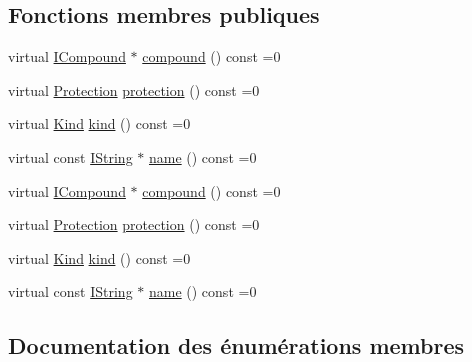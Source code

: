 \subsection*{Fonctions membres publiques}
\begin{DoxyCompactItemize}
\item 
virtual \hyperlink{class_i_compound}{I\+Compound} $\ast$ \hyperlink{class_i_related_compound_abd3870e8179f31e6bfc061ab1af7c6bd}{compound} () const  =0
\item 
virtual \hyperlink{class_i_related_compound_ac12e6e12784095cde8962012102e9709}{Protection} \hyperlink{class_i_related_compound_af3e8f1ef9664342f6200349e47ff5d18}{protection} () const  =0
\item 
virtual \hyperlink{class_i_related_compound_a70abfb2e64571aa06b83bd7da0888363}{Kind} \hyperlink{class_i_related_compound_a24dee0bec50846158feaed7639aae060}{kind} () const  =0
\item 
virtual const \hyperlink{class_i_string}{I\+String} $\ast$ \hyperlink{class_i_related_compound_af99bd2e0ec6834f84d41401c2532c52f}{name} () const  =0
\item 
virtual \hyperlink{class_i_compound}{I\+Compound} $\ast$ \hyperlink{class_i_related_compound_abd3870e8179f31e6bfc061ab1af7c6bd}{compound} () const  =0
\item 
virtual \hyperlink{class_i_related_compound_ac12e6e12784095cde8962012102e9709}{Protection} \hyperlink{class_i_related_compound_af3e8f1ef9664342f6200349e47ff5d18}{protection} () const  =0
\item 
virtual \hyperlink{class_i_related_compound_a70abfb2e64571aa06b83bd7da0888363}{Kind} \hyperlink{class_i_related_compound_a24dee0bec50846158feaed7639aae060}{kind} () const  =0
\item 
virtual const \hyperlink{class_i_string}{I\+String} $\ast$ \hyperlink{class_i_related_compound_af99bd2e0ec6834f84d41401c2532c52f}{name} () const  =0
\end{DoxyCompactItemize}


\subsection{Documentation des énumérations membres}
\hypertarget{class_i_related_compound_a70abfb2e64571aa06b83bd7da0888363}{}
